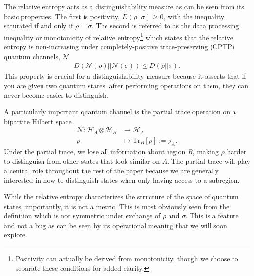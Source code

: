 \documentclass[a4paper,11pt]{article}
\newcommand{\Tr}{\text{Tr}}
\begin{document}
The relative entropy acts as a distinguishability measure as can be seen from its basic properties. The first is positivity, $D(\rho || \sigma)  \geq  0$, with the inequality saturated if and only if $\rho = \sigma$. The second is referred to as the data processing inequality or monotonicity of relative entropy\footnote{Positivity can actually be derived from monotonicity, though we choose to separate these conditions for added clarity.} which states that the relative entropy is non-increasing under completely-positive trace-preserving (CPTP) quantum channels, $\mathcal{N}$ \cite{lindblad1975}
\begin{align}
    D(\mathcal{N}(\rho)|| \mathcal{N}(\sigma)) \leq D(\rho|| \sigma) .
\end{align}
This property is crucial for a distinguishability measure because it asserts that if you are given two quantum states, after performing operations on them, they can never become easier to distinguish.

A particularly important quantum channel is the partial trace operation on a bipartite Hilbert space
\begin{align}
    \mathcal{N}: \mathcal{H}_A \otimes \mathcal{H}_B &\rightarrow \mathcal{H}_A
    \\
    \rho &\mapsto \Tr_B \left[\rho\right]:=\rho_A.
\end{align}
Under the partial trace, we lose all information about region $B$, making $\rho$ harder to distinguish from other states that look similar on $A$. The partial trace will play a central role throughout the rest of the paper because we are generally interested in how to distinguish states when only having access to a subregion.

While the relative entropy characterizes the structure of the space of quantum states, importantly, it is not a metric. This is most obviously seen from the definition which is not symmetric under exchange of $\rho$ and $\sigma$. This is a feature and not a bug as can be seen by its operational meaning that we will soon explore.
\end{document}
